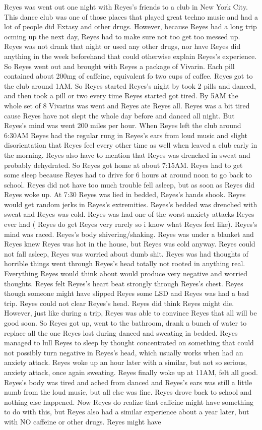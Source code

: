\documentclass[12pt]{book}
\begin{document}
Reyes was went out one night with Reyes's friends to a club in New York City. This dance club was one of those places that played great techno music and had a lot of people did Extasy and other drugs. However, because Reyes had a long trip ocming up the next day, Reyes had to make sure not too get too messed up. Reyes was not drank that night or used any other drugs, nor have Reyes did anything in the week beforehand that could otherwise explain Reyes's experience. So Reyes went out and brought with Reyes a package of Vivarin. Each pill contained about 200mg of caffeine, equivalent fo two cups of coffee. Reyes got to the club around 1AM. So Reyes started Reyes's night by took 2 pills and danced, and then took a pill or two every time Reyes started got tired. By 5AM the whole set of 8 Vivarins was went and Reyes ate Reyes all. Reyes was a bit tired cause Reyes have not slept the whole day before and danced all night. But Reyes's mind was went 200 miles per hour. When Reyes left the club around 6:30AM Reyes had the regular rung in Reyes's ears from loud music and slight disorientation that Reyes feel every other time as well when leaved a club early in the morning. Reyes also have to mention that Reyes was drenched in sweat and probably dehydrated. So Reyes got home at about 7:15AM. Reyes had to get some sleep because Reyes had to drive for 6 hours at around noon to go back to school. Reyes did not have too much trouble fell asleep, but as soon as Reyes did Reyes woke up. At 7:30 Reyes was lied in bedded, Reyes's hands shook. Reyes would get random jerks in Reyes's extremities. Reyes's bedded was drenched with sweat and Reyes was cold. Reyes was had one of the worst anxiety attacks Reyes ever had ( Reyes do get Reyes very rarely so i know what Reyes feel like). Reyes's mind was raced. Reyes's body shivering/shaking. Reyes was under a blanket and Reyes knew Reyes was hot in the house, but Reyes was cold anyway. Reyes could not fall asleep, Reyes was worried about dumb shit. Reyes was had thoughts of horrible things went through Reyes's head totally not rooted in anything real. Everything Reyes would think about would produce very negative and worried thoughts. Reyes felt Reyes's heart beat strongly through Reyes's chest. Reyes though someone might have slipped Reyes some LSD and Reyes was had a bad trip. Reyes could not clear Reyes's head. Reyes did think Reyes might die. However, just like during a trip, Reyes was able to convince Reyes that all will be good soon. So Reyes got up, went to the bathroom, drank a bunch of water to replace all the one Reyes lost during danced and sweating in bedded. Reyes managed to lull Reyes to sleep by thought concentrated on something that could not possibly turn negative in Reyes's head, which usually works when had an anxiety attack. Reyes woke up an hour later with a similar, but not so serious, anxiety attack, once again sweating. Reyes finally woke up at 11AM, felt all good. Reyes's body was tired and ached from danced and Reyes's ears was still a little numb from the loud music, but all else was fine. Reyes drove back to school and nothing else happened. Now Reyes do realize that caffeine might have something to do with this, but Reyes also had a similar experience about a year later, but with NO caffeine or other drugs. Reyes might have 
\end{document}
